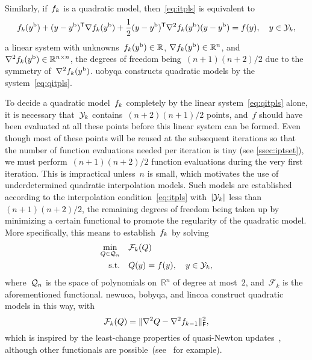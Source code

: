 \documentclass[11pt,draft]{article}
\numberwithin{equation}{section}
\newcommand{\R}{\mathbb{R}}
\newcommand{\T}{\mathsf{T}}
\newcommand{\abs}[2][]{#1\lvert#2#1\rvert}
\newcommand{\norm}[2][]{#1\lVert#2#1\rVert}
\newcommand{\base}{{\text{b}}}
\newcommand{\frob}{\mathsf{F}}
\newcommand{\func}{\mathcal{F}}
\newcommand{\obj}{f}
\newcommand{\objm}[1][k]{\obj\ifthenelse{\equal{#1}{}}{}{_{#1}}}
\newcommand{\qspace}[1][n]{\mathcal{Q}\ifthenelse{\equal{#1}{}}{}{_{#1}}}
\newcommand{\st}{\text{s.t.}}
\newcommand{\xpt}[1][k]{\mathcal{Y}\ifthenelse{\equal{#1}{}}{}{_{#1}}}
\begin{document}
Similarly, if~$\objm$ is a quadratic model, then~\cref{eq:itpls} is equivalent to
\begin{equation}
    \label{eq:qitpls}
    \objm(y^{\base}) + (y -y^{\base})^{\T} \nabla \objm(y^{\base})
    + \frac{1}{2}(y-y^{\base})^{\T}  \nabla^2 \objm(y^{\base}) (y-y^{\base}) = \obj(y),  \quad y \in \xpt,
\end{equation}
a linear system with unknowns~$\objm(y^\base) \in \R$, $\nabla \objm(y^\base) \in \R^n$, and~$\nabla^2 \objm(y^{\base})\in\R^{n \times n}$, the degrees of freedom being~$(n + 1)(n + 2) / 2$ due to the symmetry of~$\nabla^2 \objm(y^\base)$.
\Gls{uobyqa} constructs quadratic models by the system~\cref{eq:qitpls}.

To decide a quadratic model~$\objm$ completely by the linear system~\cref{eq:qitpls} alone, it is necessary that~$\xpt$ contains~$(n+2)(n+1)/2$ points, and~$f$ should have been evaluated at all these points before this linear system can be formed.
Even though most of these points will be reused at the subsequent iterations so that the number of function evaluations needed per iteration is tiny (see \cref{ssec:iptset}), we must perform~$(n + 1)(n + 2) / 2$ function evaluations during the very first iteration.
This is impractical unless~$n$ is small, which motivates the use of underdetermined quadratic interpolation models.
Such models are established according to the interpolation condition~\cref{eq:itpls} with~$\abs{\xpt}$ less than~$(n + 1)(n + 2) / 2$, the remaining degrees of freedom being taken up by minimizing a certain functional to promote the regularity of the quadratic model.
More specifically, this means to establish~$\objm$ by solving
\begin{equation}
    \label{eq:undqitp}
    \begin{split}
        \min_{Q \in \qspace}    & \quad \func_k(Q) \\
        \st                     & \quad Q(y) = \obj(y), \quad y \in \xpt,
    \end{split}
\end{equation}
where~$\qspace$ is the space of polynomials on~$\R^n$ of degree at most~$2$, and~$\func_k$ is the aforementioned functional.
\gls{newuoa}, \gls{bobyqa}, and \gls{lincoa} construct quadratic models in this way, with
\begin{equation}
    \label{eq:leastchange}
    \func_k(Q) = \norm{\nabla^2 Q - \nabla^2 \objm[k - 1]}_{\frob}^2,
\end{equation}
which is inspired by the least-change properties of quasi-Newton updates~\cite{Dennis_Schnabel_1979}, although other functionals are possible~(see~\cite{Conn_Toint_1996,Bandeira_Scheinberg_Vicente_2012,Powell_2013,Zhang_2014} for example).
\end{document}
